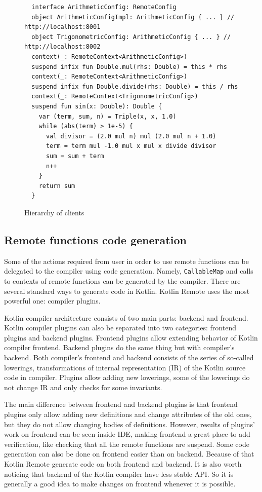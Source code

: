 \documentclass[a4paper,11pt,oneside]{article}
\newcommand{\kotlini}[1]{\texttt{#1}}
\begin{document}
\begin{figure}[!h]
  \begin{verbatim}
  interface ArithmeticConfig: RemoteConfig
  object ArithmeticConfigImpl: ArithmeticConfig { ... } // http://localhost:8001
  object TrigonometricConfig: ArithmeticConfig { ... } // http://localhost:8002
  context(_: RemoteContext<ArithmeticConfig>)
  suspend infix fun Double.mul(rhs: Double) = this * rhs
  context(_: RemoteContext<ArithmeticConfig>)
  suspend infix fun Double.divide(rhs: Double) = this / rhs
  context(_: RemoteContext<TrigonometricConfig>)
  suspend fun sin(x: Double): Double {
    var (term, sum, n) = Triple(x, x, 1.0)
    while (abs(term) > 1e-5) {
      val divisor = (2.0 mul n) mul (2.0 mul n + 1.0)
      term = term mul -1.0 mul x mul x divide divisor
      sum = sum + term
      n++
    }
    return sum
  }
  \end{verbatim}
  \caption{Hierarchy of clients}\label{sin_example}
\end{figure}

\subsection{Remote functions code generation}\label{remote_functions_code_generation}

Some of the actions required from user in order to use remote functions can be delegated to the
compiler using code generation. Namely, \kotlini{CallableMap} and calls to contexts of remote functions
can be generated by the compiler. There are several standard ways to generate code in Kotlin. Kotlin 
Remote uses the most powerful one: compiler plugins. 

Kotlin compiler architecture consists of two main parts: backend and frontend. Kotlin compiler
plugins can also be separated into two categories: frontend plugins and backend plugins. Frontend
plugins allow extending behavior of Kotlin compiler frontend. Backend plugins do the same thing but
with compiler's backend. Both compiler's frontend and backend consists of the series of so-called lowerings,
transformations of internal representation (IR) of the Kotlin source code in compiler. Plugins allow adding
new lowerings, some of the lowerings do not change IR and only checks for some invariants.

The main difference between frontend and backend plugins is that frontend plugins only allow adding 
new definitions and change attributes of the old ones, but they do not allow changing bodies of definitions.
However, results of plugins' work on frontend can be seen inside IDE, making frontend a great place to
add verification, like checking that all the remote functions are suspend. Some code generation can 
also be done on frontend easier than on backend. Because of that Kotlin Remote generate code on both frontend
and backend. It is also worth noticing that backend of the Kotlin compiler have less stable API. So 
it is generally a good idea to make changes on frontend whenever it is possible. 
\end{document}
